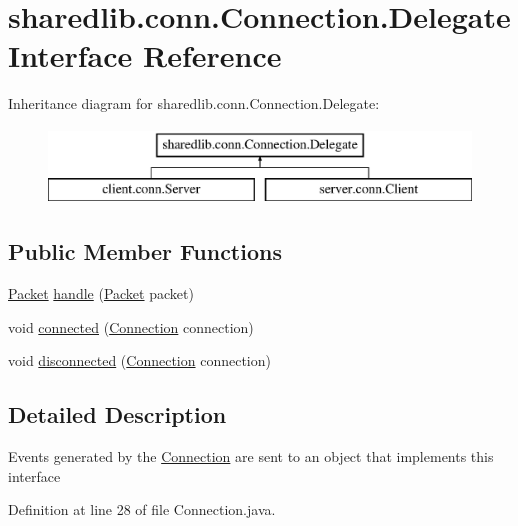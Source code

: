 \hypertarget{interfacesharedlib_1_1conn_1_1_connection_1_1_delegate}{}\section{sharedlib.\+conn.\+Connection.\+Delegate Interface Reference}
\label{interfacesharedlib_1_1conn_1_1_connection_1_1_delegate}
Inheritance diagram for sharedlib.\+conn.\+Connection.\+Delegate\+:\begin{figure}[H]
\begin{center}
\leavevmode
\includegraphics[height=2.000000cm]{interfacesharedlib_1_1conn_1_1_connection_1_1_delegate}
\end{center}
\end{figure}
\subsection*{Public Member Functions}
\begin{DoxyCompactItemize}
\item 
\hyperlink{classsharedlib_1_1conn_1_1_packet}{Packet} \hyperlink{interfacesharedlib_1_1conn_1_1_connection_1_1_delegate_abb4308f0b1aa890e0c19635f1eb9cd09}{handle} (\hyperlink{classsharedlib_1_1conn_1_1_packet}{Packet} packet)
\item 
void \hyperlink{interfacesharedlib_1_1conn_1_1_connection_1_1_delegate_acb701b2d46601fd448eba6c79b82694d}{connected} (\hyperlink{classsharedlib_1_1conn_1_1_connection}{Connection} connection)
\item 
void \hyperlink{interfacesharedlib_1_1conn_1_1_connection_1_1_delegate_a64e49ea25180c770c2cbc1953fd79fed}{disconnected} (\hyperlink{classsharedlib_1_1conn_1_1_connection}{Connection} connection)
\end{DoxyCompactItemize}


\subsection{Detailed Description}
Events generated by the \hyperlink{classsharedlib_1_1conn_1_1_connection}{Connection} are sent to an object that implements this interface 

Definition at line 28 of file Connection.\+java.



